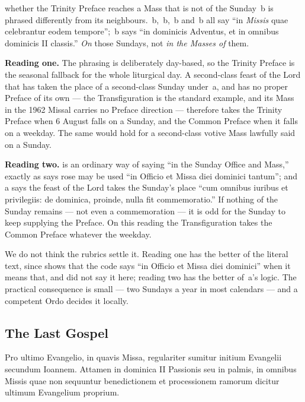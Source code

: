 \begin{contested}{whether the Trinity Preface reaches a Mass that is not of the
Sunday}
\,b is phrased differently from its neighbours. \,b,
\,b, \,b and \,b all say ``in \emph{Missis} quae
celebrantur eodem tempore''; \,b says ``in dominicis Adventus, et in
omnibus dominicis II classis.'' \emph{On} those Sundays, not \emph{in the
Masses of} them.

\textbf{Reading one.} The phrasing is deliberately day-based, so the Trinity
Preface is the seasonal fallback for the whole liturgical day. A second-class
feast of the Lord that has taken the place of a second-class Sunday under
\,a, and has no proper Preface of its own --- the Transfiguration is
the standard example, and its Mass in the 1962 Missal carries no Preface
direction --- therefore takes the Trinity Preface when 6 August falls on a
Sunday, and the Common Preface when it falls on a weekday. The same would hold
for a second-class votive Mass lawfully said on a Sunday.

\textbf{Reading two.}  is an ordinary way of saying ``in
the Sunday Office and Mass,'' exactly as  says rose may be used ``in
Officio et Missa diei dominici tantum''; and \,a says the feast of the
Lord takes the Sunday's place ``cum omnibus iuribus et privilegiis: de
dominica, proinde, nulla fit commemoratio.'' If nothing of the Sunday remains
--- not even a commemoration --- it is odd for the Sunday to keep supplying the
Preface. On this reading the Transfiguration takes the Common Preface whatever
the weekday.

We do not think the rubrics settle it. Reading one has the better of the
literal text, since  shows that the code says ``in Officio et Missa
diei dominici'' when it means that, and did not say it here; reading two has
the better of \,a's logic. The practical consequence is small --- two
Sundays a year in most calendars --- and a competent Ordo decides it locally.
\end{contested}

\subsection{The Last Gospel}

\begin{rulebox}{}
Pro ultimo Evangelio, in quavis Missa, regulariter sumitur initium Evangelii
secundum Ioannem. Attamen in dominica II Passionis seu in palmis, in omnibus
Missis quae non sequuntur benedictionem et processionem ramorum dicitur
ultimum Evangelium proprium.
\end{rulebox}

